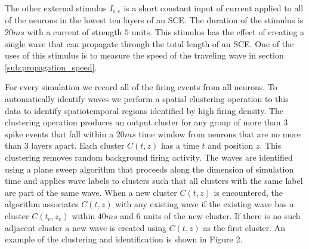 \documentclass[12pt]{article}
\begin{document}
The other external stimulus $I_{i,e}$ is a short constant input of current applied to all of the neurons in the lowest ten layers of an SCE. 
The duration of the stimulus is $20 ms$ with a current of strength $5$ units. 
This stimulus has the effect of creating a single wave that can propagate through the total length of an SCE.
One of the uses of this stimulus is to measure the speed of the traveling wave in section \ref{sub:propagation_speed}.

For every simulation we record all of the firing events from all neurons. 
To automatically identify waves we perform a spatial clustering operation to this data to identify spatiotemporal regions identified by high firing density. 
The clustering operation produces an output cluster for any group of more than $3$ spike events that fall within a $20ms$ time window from neurons that are no more than $3$ layers apart.
Each cluster $C(t,z)$ has a time $t$ and position $z$.
This clustering removes random background firing activity. 
The waves are identified using a plane sweep algorithm that proceeds along the dimension of simulation time and applies wave labels to clusters such that all clusters with the same label are part of the same wave.
When a new cluster $C(t,z)$ is encountered, the algorithm associates $C(t,z)$ with any existing wave if the existing wave has a cluster $C(t_c,z_c)$ within $40 ms$ and $6$ units of the new cluster.
If there is no such adjacent cluster a new wave is created using $C(t,z)$ as the first cluster.
An example of the clustering and identification is shown in Figure 2.
\end{document}
